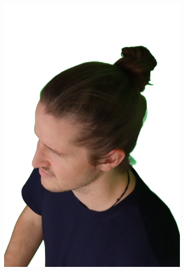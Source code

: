 \begin{figure}[!ht]
\begin{subfigure}{0.12\linewidth}
        \includegraphics[width=\textwidth]{Figures/results/initials/ephra/22_render.png}

\end{subfigure}
\end{figure}
